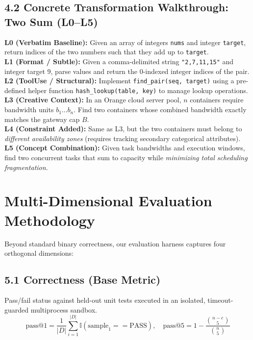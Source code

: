 \documentclass[12pt, a4paper]{article}
\begin{document}
\subsection{4.2 Concrete Transformation Walkthrough: Two Sum (L0--L5)}

\begin{researchbox}[title={Concrete Transformation Walkthrough: Two Sum Across L0--L5}]
\textbf{L0 (Verbatim Baseline):} Given an array of integers \texttt{nums} and integer \texttt{target}, return indices of the two numbers such that they add up to \texttt{target}.\\[4pt]
\textbf{L1 (Format / Subtle):} Given a comma-delimited string \texttt{"2,7,11,15"} and integer target 9, parse values and return the 0-indexed integer indices of the pair.\\[4pt]
\textbf{L2 (ToolUse / Structural):} Implement \texttt{find\_pair(seq, target)} using a pre-defined helper function \texttt{hash\_lookup(table, key)} to manage lookup operations.\\[4pt]
\textbf{L3 (Creative Context):} In an Orange cloud server pool, $n$ containers require bandwidth units $b_1 \ldots b_n$. Find two containers whose combined bandwidth exactly matches the gateway cap $B$.\\[4pt]
\textbf{L4 (Constraint Added):} Same as L3, but the two containers must belong to \emph{different availability zones} (requires tracking secondary categorical attributes).\\[4pt]
\textbf{L5 (Concept Combination):} Given task bandwidths and execution windows, find two concurrent tasks that sum to capacity while \emph{minimizing total scheduling fragmentation}.
\end{researchbox}

\section{Multi-Dimensional Evaluation Methodology}

Beyond standard binary correctness, our evaluation harness captures four orthogonal dimensions:

\subsection{5.1 Correctness (Base Metric)}
Pass/fail status against held-out unit tests executed in an isolated, timeout-guarded multiprocess sandbox.
\[
\text{pass@1} = \frac{1}{|D|} \sum_{i=1}^{|D|} \mathbb{I}(\text{sample}_1 == \text{PASS}), \quad \text{pass@5} = 1 - \frac{\binom{n-c}{5}}{\binom{n}{5}}
\]
\end{document}
